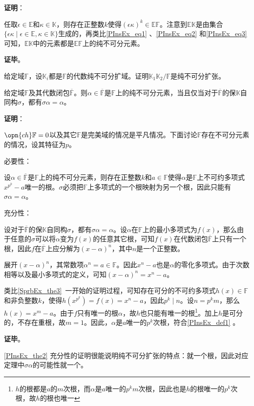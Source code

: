 \textbf{证明}：

任取$\epsilon\in\mathbb{E}$和$\kappa\in\mathbb{K}$，则存在正整数$k$使得$(\epsilon\kappa)^k\in\mathbb{EF}$。注意到$\mathbb{EK}$是由集合$\{\epsilon\kappa\mid\epsilon\in\mathbb{E}, \kappa\in\mathbb{K}\}$生成的，再类比\autoref{PInsEx_eq1} 、\autoref{PInsEx_eq2} 和\autoref{PInsEx_eq3} 可知，$\mathbb{EK}$中的元素都是$\mathbb{EF}$上的纯不可分元素。

\textbf{证毕}。


\begin{exercise}{}
给定域$\mathbb{F}$，设$\mathbb{K}_i$都是$\mathbb{F}$的代数纯不可分扩域。证明$\mathbb{K}_1\mathbb{K}_2/\mathbb{F}$是纯不可分扩张。
\end{exercise}

\begin{theorem}{}\label{PInsEx_the2}
给定域$\mathbb{F}$及其代数闭包$\overline{\mathbb{F}}$。则$\alpha\in\overline{\mathbb{F}}$是$\mathbb{F}$上的纯不可分元素，当且仅当对于$\overline{\mathbb{F}}$的保$\mathbb{K}$自同构$\sigma$，都有$\sigma\alpha=\alpha$。
\end{theorem}

\textbf{证明}：

$\opn{ch}\mathbb{F}=0$以及其它$\mathbb{F}$是完美域的情况是平凡情况。下面讨论$\mathbb{F}$存在不可分元素的情况，设其特征为$p$。

必要性：

设$\alpha\in\overline{\mathbb{F}}$是$\mathbb{F}$上的纯不可分元素，则存在正整数$k$和$a\in\mathbb{F}$使得$\alpha$是$\mathbb{F}$上不可约多项式$x^{p^k}-a$唯一的根。$\sigma$必须把$\mathbb{F}$上多项式的一个根映射为另一个根，因此只能有$\sigma\alpha=\alpha$。







充分性：

设对于$\overline{\mathbb{F}}$的保$\mathbb{K}$自同构$\sigma$，都有$\sigma\alpha=\alpha$。设$\alpha$在$\mathbb{F}$上的最小多项式为$f(x)$，那么由于任意的$\sigma$可以将$\alpha$变为$f(x)$的任意其它根，可知$f(x)$在代数闭包$\overline{\mathbb{F}}$上只有一个根，因此$f$在$\overline{\mathbb{F}}$上应分解为$(x-\alpha)^n$，其中$n$是一个正整数。

展开$(x-\alpha)^n$，其常数项$\alpha^n=a\in\mathbb{F}$。因此$x^n-a$也是$\alpha$的零化多项式。由于次数相等以及最小多项式的定义，可知$(x-\alpha)^n=x^n-a$。

类比\autoref{SprbEx_the3}~一开始的证明过程，可知存在可分的不可约多项式$h(x)\in\mathbb{F}$和非负整数$k$，使得$h(x^{p^k})=f(x)=x^n-a$，因此$p^k\mid n$。设$n=p^km$，那么$h(x)=x^m-a$。由于$f$只有唯一的根$\alpha$，故$h$也只能有唯一的根\footnote{$h$的根都是$a$的$m$次根，而$\alpha$是$a$唯一的$p^km$次根，因此也是$h$的根唯一的$p^k$次根，故$h$的根也唯一}。加上$h$是可分的，不存在重根，故$m=1$。因此，$\alpha$是$a$唯一的$p^k$次根，符合\autoref{PInsEx_def1} 。

\textbf{证毕}。

\autoref{PInsEx_the2} 充分性的证明很能说明纯不可分扩张的特点：就一个根，因此对应定理中$\sigma \alpha$的可能性就一个。








